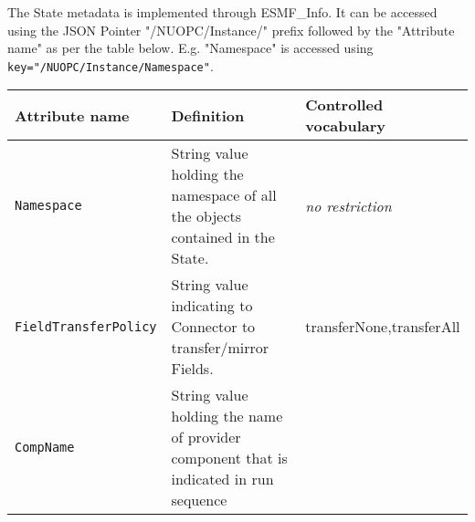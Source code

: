 \label{StateMeta}
The State metadata is implemented through ESMF\_Info. It can be accessed
using the JSON Pointer "/NUOPC/Instance/" prefix followed by the "Attribute name"
as per the table below. E.g. "Namespace" is accessed using {\tt key="/NUOPC/Instance/Namespace"}.

\begin{longtable}{|p{}|p{}|p{}|}
     \hline\hline
     {\bf Attribute name} & {\bf Definition} & {\bf Controlled vocabulary}\\
     \hline\hline
     {\tt Namespace}            & String value holding the namespace of all the objects contained in the State.& {\em no restriction}\\ \hline
     {\tt FieldTransferPolicy}  & String value indicating to Connector to transfer/mirror Fields. & transferNone,\newline transferAll\\ \hline
     {\tt CompName}             & String value holding the name of provider component that is indicated in run sequence\\ \hline
     \hline
\end{longtable}
